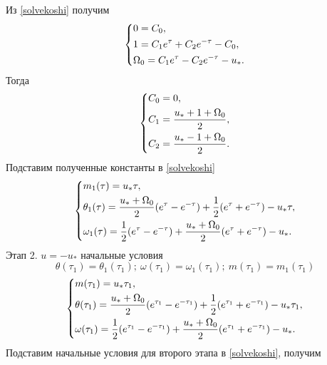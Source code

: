 \documentclass[a4paper,14pt]{article}
\theoremstyle{plain} %
\theoremstyle{definition} %
\theoremstyle{remark} %
\begin{document}
{Из \eqref{solvekoshi} получим
\[
    \left\{ {\begin{aligned}
                 & 0 = C_0, \hfill                                 \\
                 & 1 = C_1e^\tau+C_2e^{-\tau}-C_0 , \hfill         \\
                 & \Omega_0 = C_1e^\tau-C_2e^{-\tau}-u_*  . \hfill \\
            \end{aligned}} \right.
\]
Тогда
\[
    \left\{ {\begin{aligned}
                 & C_0 = 0, \hfill                         \\
                 & C_1 = \frac{u_*+1+\Omega_0}{2}, \hfill  \\
                 & C_2 = \frac{u_*-1+\Omega_0}{2} . \hfill \\
            \end{aligned}} \right.
\]
Подставим полученные константы в \eqref{solvekoshi}
\[
    \left\{ {\begin{aligned}
                 & m_1(\tau) = u_*\tau, \hfill                                                                              \\
                 & \theta_1(\tau) = \frac{u_*+\Omega_0}{2}(e^\tau-e^{-\tau})+\frac{1}{2}(e^\tau+e^{-\tau})-u_*\tau , \hfill \\
                 & \omega_1(\tau) = \frac{1}{2}(e^\tau-e^{-\tau})+\frac{u_*+\Omega_0}{2}(e^\tau+e^{-\tau})-u_*  . \hfill    \\
            \end{aligned}} \right.
\]
Этап 2. $u=-u_*$ начальные условия
\[
    \theta(\tau_1)=\theta_1(\tau_1);\ \omega(\tau_1)=\omega_1(\tau_1);\ m(\tau_1)=m_1(\tau_1)
\]
\[
    \left\{ {\begin{aligned}
                 & m(\tau_1) = u_*\tau_1, \hfill                                                                                          \\
                 & \theta(\tau_1) = \frac{u_*+\Omega_0}{2}(e^{\tau_1}-e^{-\tau_1})+\frac{1}{2}(e^{\tau_1}+e^{-\tau_1})-u_*\tau_1 , \hfill \\
                 & \omega(\tau_1) = \frac{1}{2}(e^{\tau_1}-e^{-\tau_1})+\frac{u_*+\Omega_0}{2}(e^{\tau_1}+e^{-\tau_1})-u_*  . \hfill      \\
            \end{aligned}} \right.
\]
Подставим начальные условия для второго этапа в \eqref{solvekoshi}, получим

}
\end{document}
